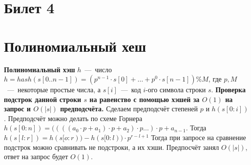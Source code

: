 \section{Билет 4}
\section*{Полиномиальный хеш}
\textbf{Полиномиальный хэш} $h$~---~число $h=hash(s[0..n-1])= (p^{n-1} \cdot s[0]+ \ldots +p^0 \cdot s[n-1]) \% M$, где $p, M$~---~некоторые простые числа, а $s[i]$~---~код $i$-ого символа строки $s$. \newline
\textbf{Проверка подстрок данной строки $s$ на равенство с помощью хэшей за $O(1)$ на запрос и $O(|s|)$ предподсчёта.}
\newline
Сделаем предподсчёт степеней $p$ и $h(s[0:i])$. Предподсчёт можно делать по схеме Горнера $h(s[0:n]) = ((((a_0 \cdot p + a_1) \cdot p + a_2) \cdot p ... ) \cdot p + a_{n - 1}$. Тогда $h(s[l:r]) = h(s[o:r)) - h(s[0:l)) \cdot p^{r-l+1}$
\newline
Тогда при запросе на сравнение подстрок можно сравнивать не подстроки, а их хэши.
\newline
Предпосчёт занял $O(|s|)$, ответ на запрос будет $O(1)$.